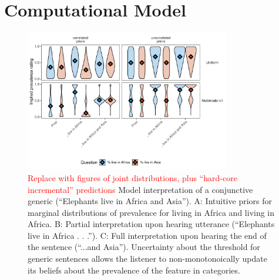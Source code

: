 \documentclass[10pt,letterpaper]{article}
\providecommand{\tightlist}{%
  \setlength{\itemsep}{0pt}\setlength{\parskip}{0pt}}
\newcommand{\red}[1]{{\textcolor{Red}{#1}}}
\begin{document}
%
%

\section{Computational Model}

\begin{figure}[h]
  \centering
    \includegraphics[width=0.8\textwidth]{model_1}
  \caption{
  \red{Replace with figures of joint distributions, plus ``hard-core incremental'' predictions}
  Model interpretation of a conjunctive generic (``Elephants live in Africa and Asia''). A: Intuitive priors for marginal distributions of prevalence for living in Africa and living in Africa. B: Partial interpretation upon hearing utterance (“Elephants live in Africa . . .”). C: Full interpretation upon hearing the end of the sentence (``...and Asia''). Uncertainty about the threshold for generic sentences allows the listener to non-monotonoically update its beliefs about the prevalence of the feature in categories.
  }
  \label{fig:model}
\end{figure}
\end{document}
